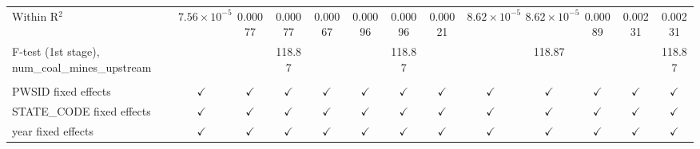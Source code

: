 \begin{table}[htbp]
\begin{adjustbox}{width = \textwidth, center}
\begin{tabular}{lcccccccccccc}
         Within R$^2$                                      & $7.56\times 10^{-5}$  & 0.00077       & 0.00077       & 0.00067       & 0.00096       & 0.00096       & 0.00021       & $8.62\times 10^{-5}$  & $8.62\times 10^{-5}$  & 0.00089       & 0.00231        & 0.00231\\  
         F-test (1st stage), num\_coal\_mines\_upstream    &                       &               & 118.87        &               &               & 118.87        &               &                       & 118.87                &               &                & 118.87\\  
          \\
         PWSID fixed effects                               & $\checkmark$          & $\checkmark$  & $\checkmark$  & $\checkmark$  & $\checkmark$  & $\checkmark$  & $\checkmark$  & $\checkmark$          & $\checkmark$          & $\checkmark$  & $\checkmark$   & $\checkmark$\\   
         STATE\_CODE fixed effects                         & $\checkmark$          & $\checkmark$  & $\checkmark$  & $\checkmark$  & $\checkmark$  & $\checkmark$  & $\checkmark$  & $\checkmark$          & $\checkmark$          & $\checkmark$  & $\checkmark$   & $\checkmark$\\   
         year fixed effects                                & $\checkmark$          & $\checkmark$  & $\checkmark$  & $\checkmark$  & $\checkmark$  & $\checkmark$  & $\checkmark$  & $\checkmark$          & $\checkmark$          & $\checkmark$  & $\checkmark$   & $\checkmark$\\   
         \bottomrule
      \end{tabular}
   \end{adjustbox}
\end{table}


